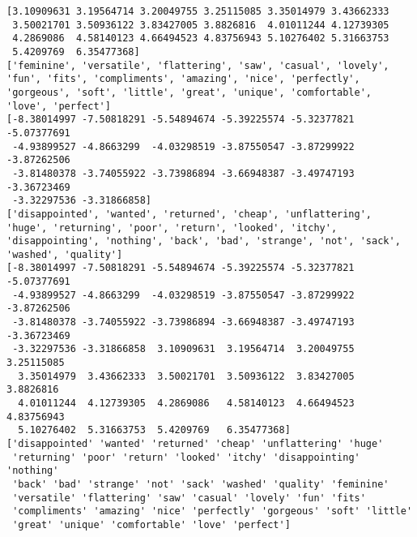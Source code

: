 \documentclass[11pt]{article}
\begin{document}
    \begin{Verbatim}[commandchars=\\\{\}]
[3.10909631 3.19564714 3.20049755 3.25115085 3.35014979 3.43662333
 3.50021701 3.50936122 3.83427005 3.8826816  4.01011244 4.12739305
 4.2869086  4.58140123 4.66494523 4.83756943 5.10276402 5.31663753
 5.4209769  6.35477368]
['feminine', 'versatile', 'flattering', 'saw', 'casual', 'lovely', 'fun', 'fits', 'compliments', 'amazing', 'nice', 'perfectly', 'gorgeous', 'soft', 'little', 'great', 'unique', 'comfortable', 'love', 'perfect']
[-8.38014997 -7.50818291 -5.54894674 -5.39225574 -5.32377821 -5.07377691
 -4.93899527 -4.8663299  -4.03298519 -3.87550547 -3.87299922 -3.87262506
 -3.81480378 -3.74055922 -3.73986894 -3.66948387 -3.49747193 -3.36723469
 -3.32297536 -3.31866858]
['disappointed', 'wanted', 'returned', 'cheap', 'unflattering', 'huge', 'returning', 'poor', 'return', 'looked', 'itchy', 'disappointing', 'nothing', 'back', 'bad', 'strange', 'not', 'sack', 'washed', 'quality']
[-8.38014997 -7.50818291 -5.54894674 -5.39225574 -5.32377821 -5.07377691
 -4.93899527 -4.8663299  -4.03298519 -3.87550547 -3.87299922 -3.87262506
 -3.81480378 -3.74055922 -3.73986894 -3.66948387 -3.49747193 -3.36723469
 -3.32297536 -3.31866858  3.10909631  3.19564714  3.20049755  3.25115085
  3.35014979  3.43662333  3.50021701  3.50936122  3.83427005  3.8826816
  4.01011244  4.12739305  4.2869086   4.58140123  4.66494523  4.83756943
  5.10276402  5.31663753  5.4209769   6.35477368]
['disappointed' 'wanted' 'returned' 'cheap' 'unflattering' 'huge'
 'returning' 'poor' 'return' 'looked' 'itchy' 'disappointing' 'nothing'
 'back' 'bad' 'strange' 'not' 'sack' 'washed' 'quality' 'feminine'
 'versatile' 'flattering' 'saw' 'casual' 'lovely' 'fun' 'fits'
 'compliments' 'amazing' 'nice' 'perfectly' 'gorgeous' 'soft' 'little'
 'great' 'unique' 'comfortable' 'love' 'perfect']

    \end{Verbatim}

    \begin{center}
    \end{center}
    { \hspace*{\fill} \\}
    
\end{document}
